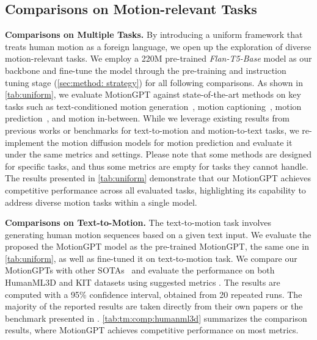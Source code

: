 \subsection{Comparisons on Motion-relevant Tasks}
\label{sec:comp}
\label{sec:comp:general}
\textbf{Comparisons on Multiple Tasks.} By introducing a uniform framework that treats human motion as a foreign language, we open up the exploration of diverse motion-relevant tasks. We employ a 220M pre-trained \textit{Flan-T5-Base}\cite{raffel2020t5,chung2022flant5} model as our backbone and fine-tune the model through the pre-training and instruction tuning stage (\cref{sec:method: strategy}) for all following comparisons.
%
As shown in \cref{tab:uniform}, we evaluate MotionGPT against state-of-the-art methods on key tasks such as text-conditioned motion generation~\cite{chen2023mld,zhang2023generating,chuan2022tm2t,mdm2022human}, motion captioning~\cite{chuan2022tm2t}, motion prediction~\cite{mdm2022human}, and motion in-between\cite{mdm2022human}. 
While we leverage existing results from previous works or benchmarks for text-to-motion and motion-to-text tasks, we re-implement the motion diffusion models \cite{mdm2022human} for motion prediction and evaluate it under the same metrics and settings.
Please note that some methods are designed for specific tasks, and thus some metrics are empty for tasks they cannot handle.
The results presented in \cref{tab:uniform} demonstrate that our MotionGPT achieves competitive performance across all evaluated tasks, highlighting its capability to address diverse motion tasks within a single model.


\label{sec:comp:text}
\textbf{Comparisons on Text-to-Motion.} The text-to-motion task involves generating human motion sequences based on a given text input. We evaluate the proposed the MotionGPT model as the pre-trained MotionGPT, the same one in \cref{tab:uniform}, as well as fine-tuned it on text-to-motion task. We compare our MotionGPTs with other SOTAs~\cite{chuan2022tm2t,Guo_2022_CVPR_humanml3d,mdm2022human,chen2023mld,zhang2023generating} and evaluate the performance on both HumanML3D and KIT datasets using suggested metrics \cite{Guo_2022_CVPR_humanml3d}. The results are computed with a 95\% confidence interval, obtained from 20 repeated runs.
The majority of the reported results are taken directly from their own papers or the benchmark presented in \cite{Guo_2022_CVPR_humanml3d}.
\cref{tab:tm:comp:humanml3d} summarizes the comparison results, where MotionGPT achieves competitive performance on most metrics.



